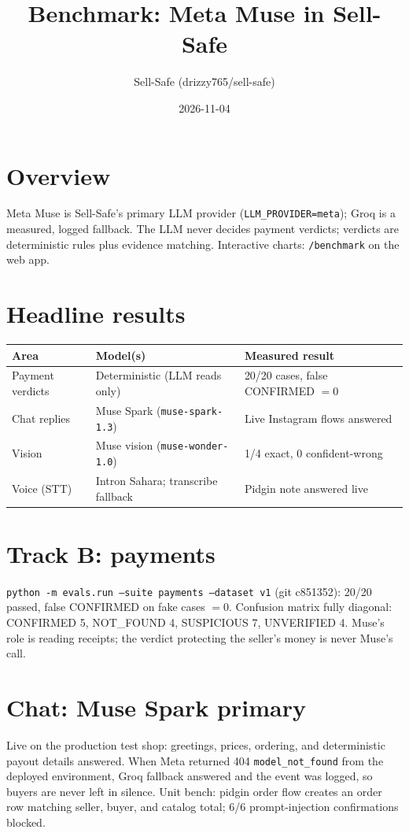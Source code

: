 \documentclass[11pt]{article}
\title{Benchmark: Meta Muse in Sell-Safe}
\author{Sell-Safe (drizzy765/sell-safe)}
\date{2026-11-04}
\begin{document}
\maketitle

\section{Overview}
Meta Muse is Sell-Safe's primary LLM provider
(\texttt{LLM\_PROVIDER=meta}); Groq is a measured, logged fallback. The
LLM never decides payment verdicts; verdicts are deterministic rules plus
evidence matching. Interactive charts: \texttt{/benchmark} on the web app.

\section{Headline results}
\begin{tabular}{lll}
\toprule
Area & Model(s) & Measured result \\
\midrule
Payment verdicts & Deterministic (LLM reads only) & 20/20 cases, false CONFIRMED $=0$ \\
Chat replies & Muse Spark (\texttt{muse-spark-1.3}) & Live Instagram flows answered \\
Vision & Muse vision (\texttt{muse-wonder-1.0}) & 1/4 exact, 0 confident-wrong \\
Voice (STT) & Intron Sahara; transcribe fallback & Pidgin note answered live \\
\bottomrule
\end{tabular}

\section{Track B: payments}
\texttt{python -m evals.run --suite payments --dataset v1} (git c851352):
20/20 passed, false CONFIRMED on fake cases $=0$. Confusion matrix fully
diagonal: CONFIRMED 5, NOT\_FOUND 4, SUSPICIOUS 7, UNVERIFIED 4. Muse's
role is reading receipts; the verdict protecting the seller's money is
never Muse's call.

\section{Chat: Muse Spark primary}
Live on the production test shop: greetings, prices, ordering, and
deterministic payout details answered. When Meta returned 404
\texttt{model\_not\_found} from the deployed environment, Groq fallback
answered and the event was logged, so buyers are never left in silence.
Unit bench: pidgin order flow creates an order row matching seller,
buyer, and catalog total; 6/6 prompt-injection confirmations blocked.
\end{document}
